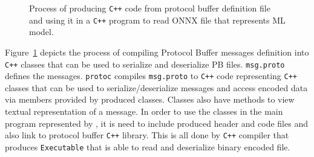 \documentclass[english, 12pt, a4paper, elec, utf8, online]{aaltothesis}
\begin{document}
\begin{figure}[h!]
\caption{Process of producing \texttt{C++} code from protocol buffer definition file and using it in a \texttt{C++} program to read ONNX file that represents ML model. }\label{fig:proto_compile}
\end{figure}

Figure~\ref{fig:proto_compile} depicts the process of compiling Protocol Buffer messages definition into \texttt{C++} classes that can be used to serialize and deserialize PB files. \texttt{msg.proto} defines the messages. \texttt{protoc} compiles \texttt{msg.proto} to \texttt{C++} code representing \texttt{C++} classes that can be used to serialize/deserialize messages and access encoded data via members provided by produced classes. Classes also have methods to view textual representation of a message. In order to use the classes in the main program represented by , it is need to include produced header and code files and also link to protocol buffer \texttt{C++} library. This is all done by \texttt{C++} compiler that produces \texttt{Executable} that is able to read and deserialize binary encoded  file.
 
\end{document}
